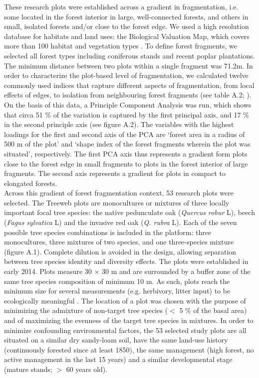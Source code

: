 \documentclass[10pt, twoside]{book} %
\begin{document}
These research plots were established across a gradient in fragmentation, i.e. some located in the forest interior in large, well-connected forests, and others in small, isolated forests and/or close to the forest edge. We used a high resolution database for habitats and land uses: the Biological Valuation Map, which covers more than 100 habitat and vegetation types \citep{Vriens2011}. To define forest fragments, we selected all forest types including coniferous stands and recent poplar plantations. The minimum distance between two plots within a single fragment was 71.2m. In order to characterize the plot-based level of fragmentation, we calculated twelve commonly used indices that capture different aspects of fragmentation, from local effects of edges, to isolation from neighbouring forest fragments (see table A.2; \citealt{McGarigal2015}). On the basis of this data, a Principle Component Analysis was run, which shows that circa 51 \% of the variation is captured by the first principal axis, and 17 \% in the second principle axis (see figure A.2). The variables with the highest loadings for the first and second axis of the PCA are `forest area in a radius of 500 m of the plot' and `shape index of the forest fragments wherein the plot was situated', respectively. The first PCA axis thus represents a gradient form plots close to the forest edge in small fragments to plots in the forest interior of large fragments. The second axis represents a gradient for plots in compact to elongated forests.\\

Across this gradient of forest fragmentation context, 53 research plots were selected. The Treeweb plots are monocultures or mixtures of three locally important focal tree species: the native pedunculate oak (\textit{Quercus robur} L), beech (\textit{Fagus sylvatica} L) and the invasive red oak (\textit{Q. rubra} L). Each of the seven possible tree species combinations is included in the platform: three monocultures, three mixtures of two species, and one three-species mixture (figure A.1).  Complete dilution is avoided in the design, allowing separation between tree species identity and diversity effects. The plots were established in early 2014. Plots measure 30 $\times$ 30 m and are surrounded by a buffer zone of the same tree species composition of minimum 10 m. As such, plots reach the minimum size for several measurements (e.g. herbivory, litter input) to be ecologically meaningful \citep{Baeten2013}. The location of a plot was chosen with the purpose of minimizing the admixture of non-target tree species ($<$ 5 \% of the basal area) and of maximizing the evenness of the target tree species in mixtures. In order to minimize confounding environmental factors, the 53 selected study plots are all situated on a similar dry sandy-loam soil, have the same land-use history (continuously forested since at least 1850), the same management (high forest, no active management in the last 15 years) and a similar developmental stage (mature stands; $>$ 60 years old).\\
\end{document}

